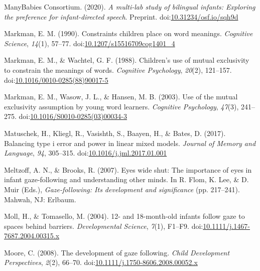 \documentclass[,man,floatsintext]{apa6}
\begin{document}
\leavevmode\hypertarget{ref-ManyBabiesConsortium_2020}{}%
ManyBabies Consortium. (2020). \emph{A multi-lab study of bilingual infants: Exploring the preference for infant-directed speech}. Preprint. doi:\href{https://doi.org/10.31234/osf.io/sqh9d}{10.31234/osf.io/sqh9d}

\leavevmode\hypertarget{ref-Markman_1990}{}%
Markman, E. M. (1990). Constraints children place on word meanings. \emph{Cognitive Science}, \emph{14}(1), 57--77. doi:\href{https://doi.org/10.1207/s15516709cog1401_4}{10.1207/s15516709cog1401\_4}

\leavevmode\hypertarget{ref-Markman_Wachtel_1988}{}%
Markman, E. M., \& Wachtel, G. F. (1988). Children's use of mutual exclusivity to constrain the meanings of words. \emph{Cognitive Psychology}, \emph{20}(2), 121--157. doi:\href{https://doi.org/10.1016/0010-0285(88)90017-5}{10.1016/0010-0285(88)90017-5}

\leavevmode\hypertarget{ref-Markman_etal_2003}{}%
Markman, E. M., Wasow, J. L., \& Hansen, M. B. (2003). Use of the mutual exclusivity assumption by young word learners. \emph{Cognitive Psychology}, \emph{47}(3), 241--275. doi:\href{https://doi.org/10.1016/S0010-0285(03)00034-3}{10.1016/S0010-0285(03)00034-3}

\leavevmode\hypertarget{ref-Matuschek_etal_2017}{}%
Matuschek, H., Kliegl, R., Vasishth, S., Baayen, H., \& Bates, D. (2017). Balancing type i error and power in linear mixed models. \emph{Journal of Memory and Language}, \emph{94}, 305--315. doi:\href{https://doi.org/10.1016/j.jml.2017.01.001}{10.1016/j.jml.2017.01.001}

\leavevmode\hypertarget{ref-Meltzoff_Brooks_2007}{}%
Meltzoff, A. N., \& Brooks, R. (2007). Eyes wide shut: The importance of eyes in infant gaze-following and understanding other minds. In R. Flom, K. Lee, \& D. Muir (Eds.), \emph{Gaze-following: Its development and significance} (pp. 217--241). Mahwah, NJ: Erlbaum.

\leavevmode\hypertarget{ref-Moll_Tomasello_2004}{}%
Moll, H., \& Tomasello, M. (2004). 12- and 18-month-old infants follow gaze to spaces behind barriers. \emph{Developmental Science}, \emph{7}(1), F1--F9. doi:\href{https://doi.org/10.1111/j.1467-7687.2004.00315.x}{10.1111/j.1467-7687.2004.00315.x}

\leavevmode\hypertarget{ref-Moore_2008}{}%
Moore, C. (2008). The development of gaze following. \emph{Child Development Perspectives}, \emph{2}(2), 66--70. doi:\href{https://doi.org/10.1111/j.1750-8606.2008.00052.x}{10.1111/j.1750-8606.2008.00052.x}
\end{document}
